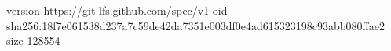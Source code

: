 version https://git-lfs.github.com/spec/v1
oid sha256:18f7e061538d237a7c59de42da7351e003df0e4ad615323198c93abb080ffae2
size 128554
